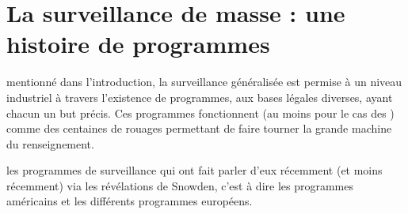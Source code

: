 
\chapter{La surveillance de masse : une histoire de programmes}
\label{ch:programmes}

\begin{doublespace}
\noindent\fontsize{18}{22}\selectfont\itshape
\nohyphenation
{}
\end{doublespace}

 mentionné dans l'introduction, la surveillance
généralisée est permise à un niveau industriel à travers l'existence de
programmes, aux bases légales diverses, ayant chacun un but précis. Ces
programmes fonctionnent (au moins pour le cas des \EUA) comme des centaines de
rouages permettant de faire tourner la grande machine du renseignement.

 les programmes de surveillance qui ont fait
parler d'eux récemment (et moins récemment) via les révélations de Snowden, c'est à dire les
programmes américains et les différents programmes européens.


\newpage

\newpage

\newpage
